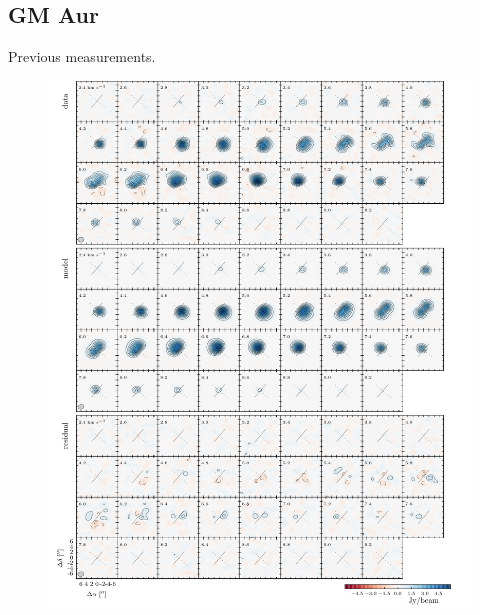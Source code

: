 \documentclass[twocolumn]{aastex6}
\begin{document}
\subsection{GM Aur}
Previous measurements.

\begin{figure}[htb]
\begin{center}
  \includegraphics{GMAur.pdf}
  \end{center}
\end{figure}
\end{document}
